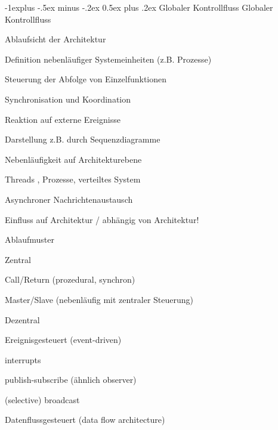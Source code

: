 \documentclass[a4paper]{article}
\makeatletter
\renewcommand{\subsection}{\@startsection{subsection}{2}{0mm}%
                                {-1explus -.5ex minus -.2ex}%
                                {0.5ex plus .2ex}%
                                {\normalfont\normalsize\bfseries}}
\makeatother
\begin{document}
\begin{multicols}{3}
  \subsection{Globaler Kontrollfluss}
  Globaler Kontrollfluss
  \begin{itemize*}
    \item Ablaufsicht der Architektur
          \begin{itemize*}
            \item Definition nebenläufiger Systemeinheiten (z.B. Prozesse)
            \item Steuerung der Abfolge von Einzelfunktionen
            \item Synchronisation und Koordination
            \item Reaktion auf externe Ereignisse
            \item Darstellung z.B. durch Sequenzdiagramme
          \end{itemize*}
    \item Nebenläufigkeit auf Architekturebene
          \begin{itemize*}
            \item Threads , Prozesse, verteiltes System
            \item Asynchroner Nachrichtenaustausch
          \end{itemize*}
    \item Einfluss auf Architektur / abhängig von Architektur!
    \item Ablaufmuster
          \begin{itemize*}
            \item Zentral
                  \begin{itemize*}
                    \item Call/Return (prozedural, synchron)
                    \item Master/Slave (nebenläufig mit zentraler Steuerung)
                  \end{itemize*}
            \item Dezentral
                  \begin{itemize*}
                    \item Ereignisgesteuert (event-driven)
                    \item interrupts
                    \item publish-subscribe (ähnlich observer)
                    \item (selective) broadcast
                    \item Datenflussgesteuert (data flow architecture)
                  \end{itemize*}
          \end{itemize*}
  \end{itemize*}


\end{multicols}
\end{document}
